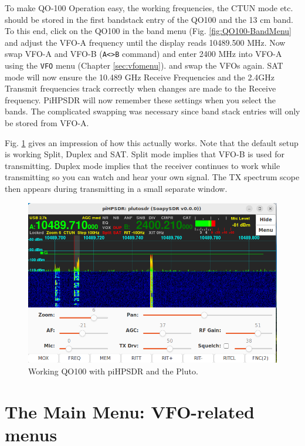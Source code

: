 \documentclass[12pt]{book}
\def\bltt#1{\texttt{\color{blue}#1}}
\begin{document}
To make QO-100 Operation easy, the working frequencies, the CTUN mode etc. should be
stored in the first bandstack entry of the QO100 and the 13 cm band. To this end,
click on the QO100 in the band menu (Fig. \ref{fig:QO100-BandMenu} and adjust the VFO-A
frequency until the display reads 10489.500 MHz. Now swap VFO-A and VFO-B (\bltt{A<>B} command)
and enter 2400 MHz into VFO-A using the \bltt{VFO} menu (Chapter \ref{sec:vfomenu}). and
swap the VFOs again. SAT mode will now ensure the 10.489 GHz Receive
 Frequencies and the 2.4GHz Transmit frequencies track correctly when changes are made
 to the Receive frequency. PiHPSDR will now remember these settings when you select
 the bands. The complicated swapping was necessary since band stack entries will
 only be stored from VFO-A.

Fig. \ref{fig:QO100-Waterfall} gives an impression of how this actually works. Note that the
default setup
is working Split, Duplex and SAT. Split mode implies that VFO-B is used for transmitting.
Duplex mode implies that the receiver continues to work while transmitting so you can watch
and hear your own signal.
The TX spectrum scope then appears during transmitting in a small separate window.
\begin{figure}[ht]
\center
\includegraphics[width=12cm]{QO100-Waterfall.png}
\caption{Working QO100 with piHPSDR and the Pluto.}
\label{fig:QO100-Waterfall}
\end{figure}
\chapter{The Main Menu: VFO-related menus}
\end{document}
